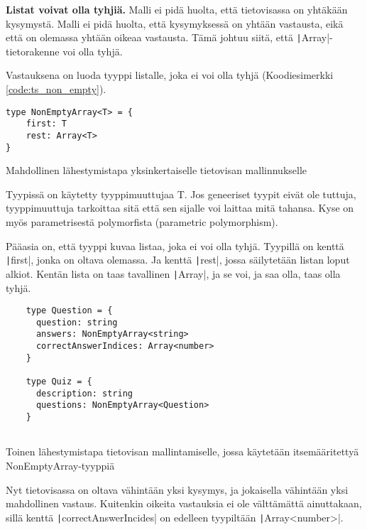 \textbf{Listat voivat olla tyhjiä.} Malli ei pidä huolta, että tietovisassa on yhtäkään kysymystä. Malli ei pidä huolta, että kysymyksessä on yhtään vastausta, eikä että on olemassa yhtään oikeaa vastausta. Tämä johtuu siitä, että \texttt|Array|-tietorakenne voi olla tyhjä.

Vastauksena on luoda tyyppi listalle, joka ei voi olla tyhjä (Koodiesimerkki \ref{code:ts_non_empty}).

\begin{code}
    \begin{verbatim}
type NonEmptyArray<T> = {
    first: T
    rest: Array<T>
}
    \end{verbatim}
    \caption{Mahdollinen lähestymistapa yksinkertaiselle tietovisan mallinnukselle}
    \label{code:ts_non_empty}
\end{code}

Tyypissä on käytetty tyyppimuuttujaa T. Jos geneeriset tyypit eivät ole tuttuja, tyyppimuuttuja tarkoittaa sitä että sen sijalle voi laittaa mitä tahansa. Kyse on myös parametrisestä polymorfista (parametric polymorphism).

Pääasia on, että tyyppi kuvaa listaa, joka ei voi olla tyhjä. Tyypillä on kenttä \texttt|first|, jonka on oltava olemassa. Ja kenttä \texttt|rest|, jossa säilytetään listan loput alkiot. Kentän lista on taas tavallinen \texttt|Array|, ja se voi, ja saa olla, taas olla tyhjä.


\begin{code}
    \begin{verbatim}
    type Question = {
      question: string
      answers: NonEmptyArray<string> 
      correctAnswerIndices: Array<number>
    }
    
    type Quiz = {
      description: string
      questions: NonEmptyArray<Question> 
    }
             
    \end{verbatim}
    \caption{Toinen lähestymistapa tietovisan mallintamiselle, jossa käytetään itsemääritettyä NonEmptyArray-tyyppiä}
    \label{code:ts_non_empty_quiz}
\end{code}

Nyt tietovisassa on oltava vähintään yksi kysymys, ja jokaisella vähintään yksi mahdollinen vastaus. Kuitenkin oikeita vastauksia ei ole välttämättä ainuttakaan, sillä kenttä \texttt|correctAnswerIncides| on edelleen tyypiltään \texttt|Array<number>|.

